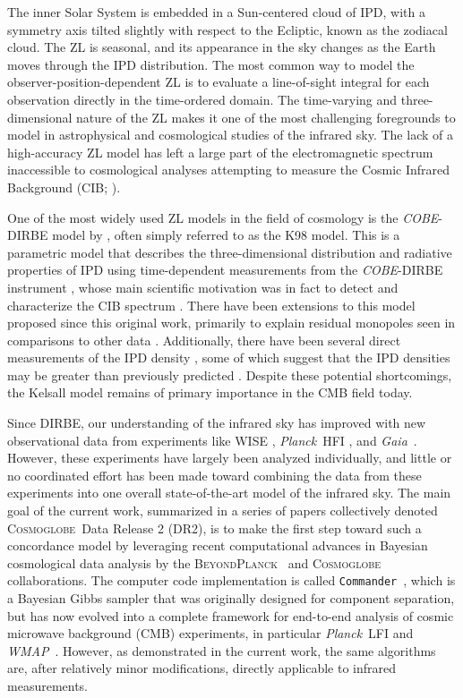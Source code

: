 \documentclass[twocolumn]{aa}
\def\commander{\texttt{Commander}}
\def\Planck{\textit{Planck}}
\def\WMAP{\textit{WMAP}}
\def\GAIA{\textit{Gaia}}
\newcommand{\BP}{\textsc{BeyondPlanck}}
\newcommand{\cosmoglobe}{\textsc{Cosmoglobe}}
\begin{document}
The inner Solar System is embedded in a Sun-centered cloud of IPD,
with a symmetry axis tilted slightly with respect to the Ecliptic,
known as the zodiacal cloud. The ZL is seasonal, and its appearance in
the sky changes as the Earth moves through the IPD distribution. The
most common way to model the observer-position-dependent ZL is to
evaluate a line-of-sight integral for each observation directly in the
time-ordered domain. The time-varying and three-dimensional nature of
the ZL makes it one of the most challenging foregrounds to model in
astrophysical and cosmological studies of the infrared sky. The lack
of a high-accuracy ZL model has left a large part of the
electromagnetic spectrum inaccessible to cosmological analyses
attempting to measure the Cosmic Infrared Background (CIB;
\citealp{partridge1967}). 

One of the most widely used ZL models in the field of cosmology is the
\textit{COBE}-DIRBE model by \citet{kelsall1998}, often simply
referred to as the K98 model. This is a parametric model that describes 
the three-dimensional distribution and radiative 
properties of IPD using time-dependent measurements from
the \textit{COBE}-DIRBE instrument \citep{hauser1998}, whose 
main scientific motivation was in fact to detect
and characterize the CIB spectrum \citep{hauser1998,hauser:2001}. There have been 
extensions to this model proposed since this original work, primarily to 
explain residual monopoles seen in comparisons to other data \citep{sano, Korngut,  skysurf}. 
Additionally, there have been several direct measurements of the IPD density 
\citep{newhorizons, parker}, some of which suggest that the IPD densities may 
be greater than previously predicted \citep{pioneer}. Despite these potential 
shortcomings, the Kelsall model remains of primary importance in the CMB field today.

Since DIRBE, our
understanding of the infrared sky has improved with new observational
data from experiments like WISE \citep{wright:2010}, \Planck\ HFI
\citep{planck2016-l03}, and \GAIA\ \citep{gaia:2016}. However, these
experiments have largely been analyzed individually, and little or no
coordinated effort has been made toward combining the data from these
experiments into one overall state-of-the-art model of the infrared
sky. The main goal of the current work, summarized in a series of
papers collectively denoted \cosmoglobe\ Data Release 2 (DR2), is to make
the first step toward such a concordance model by leveraging recent
computational advances in Bayesian cosmological data analysis by the
\BP\ \citep[][and references therein]{BP2023} and
\cosmoglobe\ \citep{Watts2023} collaborations. The computer code
implementation is called \commander\ \citep{eriksen:2004, seljebotn:2019, bp03}, which
is a Bayesian Gibbs sampler that was originally designed for component separation, but has now evolved into a complete framework for
end-to-end analysis of cosmic microwave background (CMB) experiments,
in particular \Planck\ LFI \citep{planck2016-l02} and \WMAP\
\citep{bennett2012}. However, as demonstrated in the current work, the
same algorithms are, after relatively minor modifications, directly
applicable to infrared measurements.
\end{document}
